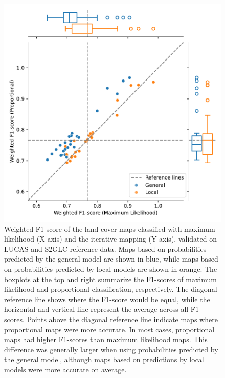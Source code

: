     \begin{figure}[H]
        \centering
        \includegraphics[width=\linewidth]{figs_04/fig8_jointplot_F1.pdf}
        \caption{Weighted F1-score of the land cover maps classified with maximum likelihood (X-axis) and the iterative mapping (Y-axis), validated on LUCAS and S2GLC reference data. Maps based on probabilities predicted by the general model are shown in blue, while maps based on probabilities predicted by local models are shown in orange. The boxplots at the top and right summarize the F1-scores of maximum likelihood and proportional classification, respectively. The diagonal reference line shows where the F1-score would be equal, while the horizontal and vertical line represent the average across all F1-scores. Points above the diagonal reference line indicate maps where proportional maps were more accurate. 
        In most cases, proportional maps had higher F1-scores than maximum likelihood maps. This difference was generally larger when using probabilities predicted by the general model, although maps based on predictions by local models were more accurate on average.}
        \label{fig:f1}
    \end{figure}

